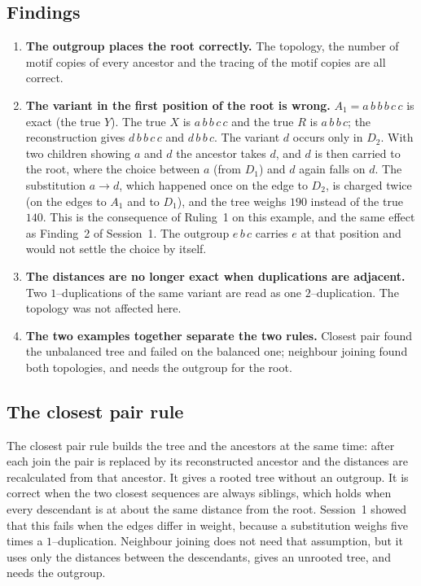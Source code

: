 \documentclass[11pt,a4paper]{article}
\begin{document}
\subsection{Findings}
\begin{enumerate}
\item \textbf{The outgroup places the root correctly.} The topology, the number of motif copies
  of every ancestor and the tracing of the motif copies are all correct.
\item \textbf{The variant in the first position of the root is wrong.} $A_1=a\,b\,b\,b\,c\,c$ is
  exact (the true $Y$). The true $X$ is $a\,b\,b\,c\,c$ and the true $R$ is $a\,b\,b\,c$; the
  reconstruction gives $d\,b\,b\,c\,c$ and $d\,b\,b\,c$. The variant $d$ occurs only in $D_2$.
  With two children showing $a$ and $d$ the ancestor takes $d$, and $d$ is then carried to the
  root, where the choice between $a$ (from $D_1$) and $d$ again falls on $d$. The substitution
  $a\to d$, which happened once on the edge to $D_2$, is charged twice (on the edges to $A_1$
  and to $D_1$), and the tree weighs $190$ instead of the true $140$. This is the consequence
  of Ruling~1 on this example, and the same effect as Finding~2 of Session~1. The outgroup
  $e\,b\,c$ carries $e$ at that position and would not settle the choice by itself.
\item \textbf{The distances are no longer exact when duplications are adjacent.} Two
  $1$--duplications of the same variant are read as one $2$--duplication. The topology was not
  affected here.
\item \textbf{The two examples together separate the two rules.} Closest pair found the
  unbalanced tree and failed on the balanced one; neighbour joining found both topologies, and
  needs the outgroup for the root.
\end{enumerate}

\subsection{The closest pair rule}\label{sec:cp}
The closest pair rule builds the tree and the ancestors at the same time: after each join the
pair is replaced by its reconstructed ancestor and the distances are recalculated from that
ancestor. It gives a rooted tree without an outgroup. It is correct when the two closest
sequences are always siblings, which holds when every descendant is at about the same distance
from the root. Session~1 showed that this fails when the edges differ in weight, because a
substitution weighs five times a $1$--duplication. Neighbour joining does not need that
assumption, but it uses only the distances between the descendants, gives an unrooted tree, and
needs the outgroup.
\end{document}
